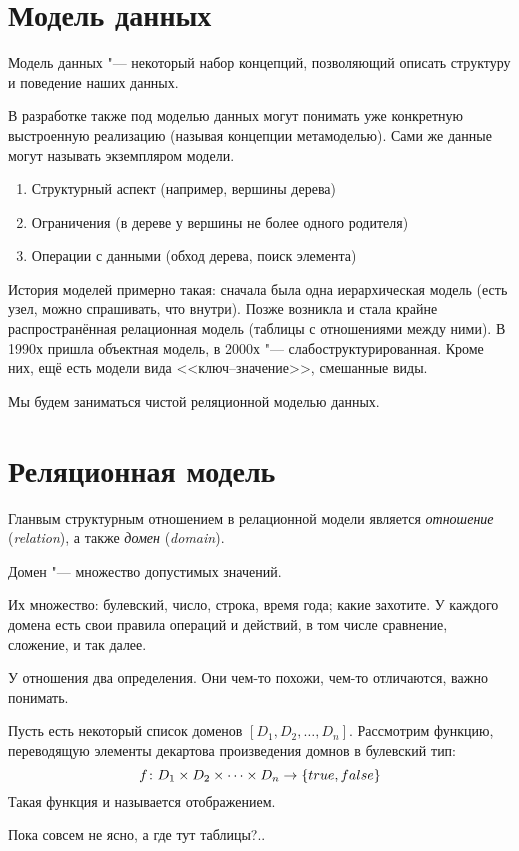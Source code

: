 \section{Модель данных}

\begin{Def}
	Модель данных "--- некоторый набор концепций, позволяющий описать структуру и поведение наших данных.
\end{Def}
В разработке также под моделью данных могут понимать уже конкретную выстроенную реализацию (называя концепции метамоделью).
Сами же данные могут называть экземпляром модели.

\begin{enumerate}
	\item Структурный аспект (например, вершины дерева)
	\item Ограничения (в дереве у вершины не более одного родителя)
	\item Операции с данными (обход дерева, поиск элемента)
\end{enumerate}

История моделей примерно такая: сначала была одна иерархическая модель (есть узел, можно спрашивать, что внутри).
Позже возникла и стала крайне распространённая релационная модель (таблицы с отношениями между ними).
В 1990х пришла объектная модель, в 2000х "--- слабоструктурированная.
Кроме них, ещё есть модели вида <<ключ--значение>>, смешанные виды.

Мы будем заниматься чистой реляционной моделью данных.

\section{Реляционная модель}

Гланвым структурным отношением в релационной модели является \textit{отношение} (\textit{relation}),
а также \textit{домен} (\textit{domain}).

\begin{Def}
	Домен "--- множество допустимых значений.
\end{Def}
Их множество: булевский, число, строка, время года; какие захотите.
У каждого домена есть свои правила операций и действий, в том числе сравнение, сложение, и так далее.

У отношения два определения. Они чем-то похожи, чем-то отличаются, важно понимать.
\begin{Def}
	Пусть есть некоторый список доменов $[D_1, D_2, \dots, D_n]$.
	Рассмотрим функцию, переводящую элементы декартова произведения домнов в булевский тип:
	\[ f\colon D_1 \times D_2 \times \dots \times D_n \rightarrow \{true, false\} \]
	Такая функция и называется отображением.
\end{Def}
Пока совсем не ясно, а где тут таблицы?..

